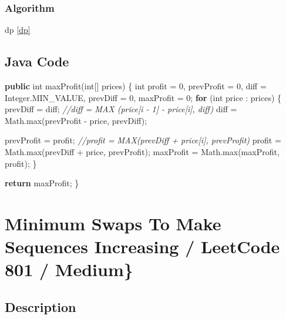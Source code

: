 \documentclass[]{book}
\newenvironment{Shaded}{\begin{snugshade}}{\end{snugshade}}
\newcommand{\BuiltInTok}[1]{#1}
\newcommand{\CommentTok}[1]{\textcolor[rgb]{0.56,0.35,0.01}{\textit{#1}}}
\newcommand{\DataTypeTok}[1]{\textcolor[rgb]{0.13,0.29,0.53}{#1}}
\newcommand{\DecValTok}[1]{\textcolor[rgb]{0.00,0.00,0.81}{#1}}
\newcommand{\FunctionTok}[1]{\textcolor[rgb]{0.00,0.00,0.00}{#1}}
\newcommand{\KeywordTok}[1]{\textcolor[rgb]{0.13,0.29,0.53}{\textbf{#1}}}
\newcommand{\NormalTok}[1]{#1}
\begin{document}
\hypertarget{algorithm-38}{%
\subsubsection{Algorithm}\label{algorithm-38}}

dp \ref{dp}

\hypertarget{java-code-32}{%
\subsection{Java Code}\label{java-code-32}}

\begin{Shaded}
\begin{Highlighting}[]
\KeywordTok{public} \DataTypeTok{int} \FunctionTok{maxProfit}\NormalTok{(}\DataTypeTok{int}\NormalTok{[] prices) \{}
    \DataTypeTok{int}\NormalTok{ profit = }\DecValTok{0}\NormalTok{, prevProfit = }\DecValTok{0}\NormalTok{, diff = }\BuiltInTok{Integer}\NormalTok{.}\FunctionTok{MIN_VALUE}\NormalTok{, prevDiff = }\DecValTok{0}\NormalTok{, maxProfit = }\DecValTok{0}\NormalTok{;}
    \KeywordTok{for}\NormalTok{ (}\DataTypeTok{int}\NormalTok{ price : prices) \{}
\NormalTok{        prevDiff = diff;}
        \CommentTok{//diff = MAX (price[i - 1] - price[i], diff)}
\NormalTok{        diff = }\BuiltInTok{Math}\NormalTok{.}\FunctionTok{max}\NormalTok{(prevProfit - price, prevDiff);}

\NormalTok{        prevProfit = profit;}
        \CommentTok{//profit = MAX(prevDiff + price[i], prevProfit)}
\NormalTok{        profit = }\BuiltInTok{Math}\NormalTok{.}\FunctionTok{max}\NormalTok{(prevDiff + price, prevProfit);}
\NormalTok{        maxProfit = }\BuiltInTok{Math}\NormalTok{.}\FunctionTok{max}\NormalTok{(maxProfit, profit);}
\NormalTok{    \}}

    \KeywordTok{return}\NormalTok{ maxProfit;}
\NormalTok{\}}
\end{Highlighting}
\end{Shaded}

\hypertarget{minimum-swaps-to-make-sequences-increasing-leetcode-801-medium}{%
\section{Minimum Swaps To Make Sequences Increasing / LeetCode 801 / Medium\}}\label{minimum-swaps-to-make-sequences-increasing-leetcode-801-medium}}

\hypertarget{description-37}{%
\subsection{Description}\label{description-37}}
\end{document}
